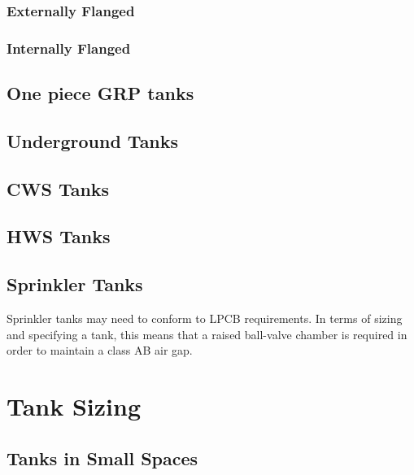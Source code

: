 \subsubsection{Externally Flanged}



\subsubsection{Internally Flanged}
\label{ssec:TIFTank}



\subsection{One piece GRP tanks}



\subsection{Underground Tanks}



\subsection{\gls{CWS} Tanks}



\subsection{\gls{HWS} Tanks}



\subsection{Sprinkler Tanks}

Sprinkler tanks may need to conform to LPCB requirements.  In terms of sizing and specifying a tank, this means that a raised ball-valve chamber is required in order to maintain a class AB air gap.

\section{Tank Sizing}


\subsection{Tanks in Small Spaces}

